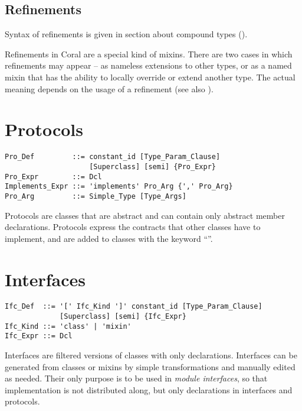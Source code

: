 \subsection{Refinements}
\label{sec:refinements}

Syntax of refinements is given in section about compound types (). 

Refinements in Coral are a special kind of mixins. There are two cases in which refinements may appear -- as nameless extensions to other types, or as a named mixin that has the ability to locally override or extend another type. The actual meaning depends on the usage of a refinement (see also ).


\section{Protocols}
\label{sec:protocols}

\syntax\begin{lstlisting}
Pro_Def         ::= constant_id [Type_Param_Clause]
                    [Superclass] [semi] {Pro_Expr}
Pro_Expr        ::= Dcl
Implements_Expr ::= 'implements' Pro_Arg {',' Pro_Arg}
Pro_Arg         ::= Simple_Type [Type_Args]
\end{lstlisting}


Protocols are classes that are abstract and can contain only abstract member declarations. Protocols express the contracts that other classes have to implement, and are added to classes with the keyword ``''. 

\section{Interfaces}
\label{sec:interfaces}

\syntax\begin{lstlisting}
Ifc_Def  ::= '[' Ifc_Kind ']' constant_id [Type_Param_Clause] 
             [Superclass] [semi] {Ifc_Expr}
Ifc_Kind ::= 'class' | 'mixin'
Ifc_Expr ::= Dcl
\end{lstlisting}

Interfaces are filtered versions of classes with only declarations. Interfaces can be generated from classes or mixins by simple transformations and manually edited as needed. Their only purpose is to be used in {\em module interfaces}, so that implementation is not distributed along, but only declarations in interfaces and protocols. 

